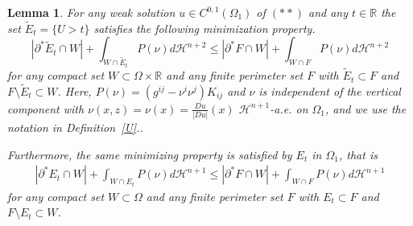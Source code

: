 \documentclass[11pt]{amsart}
\newtheorem{Lemma}[Theorem]{Lemma}
\def\R{\mathbb{R}}
\def\H{\mathcal{H}}
\def\wt{\widetilde}
\begin{document}
 \begin{Lemma} \label{eminu} For any weak solution  $u\in C^{0,1}(\Omega_1)$ of $(**)$ and any $t\in \R$  the set  $\wt E_t=\{U>t\}$ satisfies  the following minimization property.
\[|\partial^*\wt E_t\cap W|+\int_{W\cap \wt E_t} P(\nu)d\H^{n+2}\le |\partial^*F\cap W|+\int_{W\cap F} P(\nu)d\H^{n+2}\]
for any compact set $W\subset \Omega\times\R$ and any finite perimeter set $F$ with $\wt E_t\subset F$ and $F\setminus \wt E_t\subset W$.  
Here, $P(\nu)=\left(g^{ij}-\nu^i\nu^j\right) K_{ij}$ and $\nu$ is independent of the vertical component with $\nu(x,z)= \nu(x)=\frac{Du}{|Du|}(x)$ $\H^{n+1}$-a.e. on $\Omega_1$, and we use the notation in Definition~\ref{U}.. 

Furthermore, the same minimizing property is satisfied by $E_t$ in $\Omega_1$, that is
\[\begin{split}
|\partial^* E_t\cap W|+\int_{ W\cap  E_t} P(\nu)d\H^{n+1}\le |\partial^* F\cap  W|+ \int_{W\cap  F} P(\nu)d\H^{n+1}
\end{split}\]
for any compact set $W\subset\Omega$ and any finite perimeter set $F$ with $ E_t\subset F$ and $F\setminus E_t\subset W$.
\end{Lemma}
\end{document}
